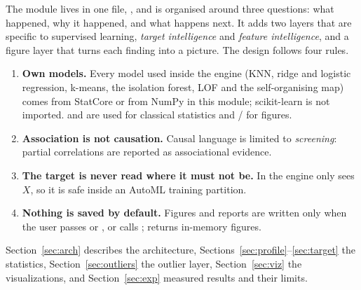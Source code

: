 \documentclass[conference]{IEEEtran}
\begin{document}
The module lives in one file, , and is organised around three questions: what happened, why it happened, and what happens next. It adds two layers that are specific to supervised learning, \emph{target intelligence} and \emph{feature intelligence}, and a figure layer that turns each finding into a picture. The design follows four rules.
\begin{enumerate}
\item \textbf{Own models.} Every model used inside the engine (KNN, ridge and logistic regression, k-means, the isolation forest, LOF and the self-organising map) comes from StatCore or from NumPy in this module; scikit-learn is not imported.  and  are used for classical statistics and / for figures.
\item \textbf{Association is not causation.} Causal language is limited to \emph{screening}: partial correlations are reported as associational evidence.
\item \textbf{The target is never read where it must not be.} In  the engine only sees $X$, so it is safe inside an AutoML training partition.
\item \textbf{Nothing is saved by default.} Figures and reports are written only when the user passes  or , or calls ;  returns in-memory figures.
\end{enumerate}
Section~\ref{sec:arch} describes the architecture, Sections~\ref{sec:profile}--\ref{sec:target} the statistics, Section~\ref{sec:outliers} the outlier layer, Section~\ref{sec:viz} the visualizations, and Section~\ref{sec:exp} measured results and their limits.
\end{document}
